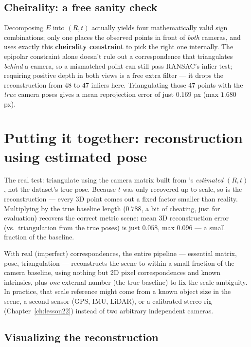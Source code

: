 \subsection*{Cheirality: a free sanity check}

Decomposing $E$ into $(R,t)$ actually yields four mathematically valid sign combinations; only one places the observed points in front of \emph{both} cameras, and  uses exactly this \textbf{cheirality constraint} to pick the right one internally. The epipolar constraint alone doesn't rule out a correspondence that triangulates \emph{behind} a camera, so a mismatched point can still pass RANSAC's inlier test; requiring positive depth in both views is a free extra filter --- it drops the reconstruction from $48$ to $47$ inliers here. Triangulating those 47 points with the \emph{true} camera poses gives a mean reprojection error of just $0.169$ px (max $1.680$ px).

\section{Putting it together: reconstruction using estimated pose}

The real test: triangulate using the camera matrix built from 's \emph{estimated} $(R,t)$, not the dataset's true pose. Because $t$ was only recovered up to scale, so is the reconstruction --- every 3D point comes out a fixed factor smaller than reality. Multiplying by the true baseline length ($0.788$, a bit of cheating, just for evaluation) recovers the correct metric scene: mean 3D reconstruction error (vs.\ triangulation from the true poses) is just $0.058$, max $0.096$ --- a small fraction of the baseline.

With real (imperfect) correspondences, the entire pipeline --- essential matrix, pose, triangulation --- reconstructs the scene to within a small fraction of the camera baseline, using nothing but 2D pixel correspondences and known intrinsics, plus \emph{one} external number (the true baseline) to fix the scale ambiguity. In practice, that scale reference might come from a known object size in the scene, a second sensor (GPS, IMU, LiDAR), or a calibrated stereo rig (Chapter~\ref{ch:lesson22}) instead of two arbitrary independent cameras.

\subsection*{Visualizing the reconstruction}


